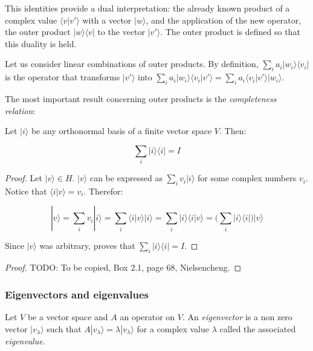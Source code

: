This identities provide a dual interpretation: the already known product of a complex value $\langle v|v'\rangle$ with a vector $|w\rangle$, and the application of the new operator, the outer product $|w\rangle\langle v|$ to the vector $|v'\rangle$. The outer product is defined so that this duality is held.

Let us consider linear combinations of outer products. By definition, $\sum_i a_i |w_i\rangle\langle v_i|$ is the operator that transforms $|v'\rangle$ into $\sum_i a_i |w_i\rangle\langle v_i|v'\rangle = \sum_i a_i \langle v_i|v'\rangle |w_i\rangle$.

The most important result concerning outer products is the \emph{completeness relation}:

\begin{proposition}
	Let $|i\rangle$ be any orthonormal basis of a finite vector space $V$. Then:
	
	$$ \sum_i |i\rangle\langle i | = I $$
\end{proposition}

\begin{proof}
	Let $|v\rangle \in H$. $|v\rangle$ can be expressed as $ \sum_i v_i |i\rangle$ for some complex numbers $v_i$. Notice that $\langle i|v\rangle = v_i$. Therefor:
	
	$$|v\rangle = \sum_i v_i |i\rangle = \sum_i \langle i|v\rangle |i\rangle = \sum_i |i\rangle\langle i|v\rangle = \bigg( \sum_i |i\rangle\langle i|\bigg) |v\rangle$$
	
	Since $|v\rangle$ was arbitrary, proves that $ \sum_i |i\rangle\langle i | = I $.
\end{proof}

\begin{corollary}
	
\end{corollary}

\begin{proof}
	TODO: To be copied, Box 2.1, page 68, Nielsencheng.
\end{proof}

\subsubsection{Eigenvectors and eigenvalues}

\begin{definition}
	Let $V$ be a vector space and $A$ an operator on $V$. An \emph{eigenvector} is a non zero vector $|v_\lambda\rangle$ such that $A|v_\lambda\rangle = \lambda|v_\lambda\rangle$ for a complex value $\lambda$ called the associated \emph{eigenvalue}.
\end{definition}

